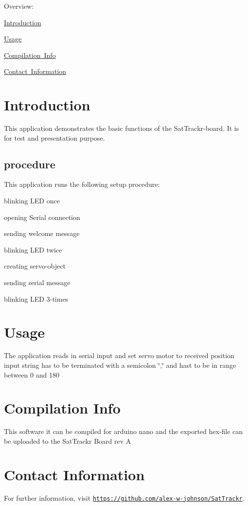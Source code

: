 Overview\+:
\begin{DoxyItemize}
\item \mbox{\hyperlink{appdoc_main_appdoc_SatTrackr_boardtest_intro}{Introduction}}
\item \mbox{\hyperlink{appdoc_main_appdoc_SatTrackr_boardtest_usage}{Usage}}
\item \mbox{\hyperlink{appdoc_main_appdoc_SatTrackr_boardtest_compinfo}{Compilation Info}}
\item \mbox{\hyperlink{appdoc_main_appdoc_SatTrackr_boardtest_contactinfo}{Contact Information}}
\end{DoxyItemize}\hypertarget{appdoc_main_appdoc_SatTrackr_boardtest_intro}{}\section{Introduction}\label{appdoc_main_appdoc_SatTrackr_boardtest_intro}
This application demonstrates the basic functions of the Sat\+Trackr-\/board. It is for test and presentation purpose.\hypertarget{appdoc_main_Setup}{}\subsection{procedure}\label{appdoc_main_Setup}
This application runs the following setup procedure\+:
\begin{DoxyItemize}
\item blinking L\+ED once
\item opening Serial connection
\item sending welcome message
\item blinking L\+ED twice
\item creating servo-\/object
\item sending serial message
\item blinking L\+ED 3-\/times
\end{DoxyItemize}\hypertarget{appdoc_main_appdoc_SatTrackr_boardtest_usage}{}\section{Usage}\label{appdoc_main_appdoc_SatTrackr_boardtest_usage}
The application reads in serial input and set servo motor to received position input string has to be terminated with a semicolon \char`\"{},\char`\"{} and hast to be in range between 0 and 180\hypertarget{appdoc_main_appdoc_SatTrackr_boardtest_compinfo}{}\section{Compilation Info}\label{appdoc_main_appdoc_SatTrackr_boardtest_compinfo}
This software it can be compiled for arduino nano and the exported hex-\/file can be uploaded to the Sat\+Trackr Board rev A\hypertarget{appdoc_main_appdoc_SatTrackr_boardtest_contactinfo}{}\section{Contact Information}\label{appdoc_main_appdoc_SatTrackr_boardtest_contactinfo}
For further information, visit \href{https://github.com/alex-w-johnson/SatTrackr}{\tt https\+://github.\+com/alex-\/w-\/johnson/\+Sat\+Trackr}. 